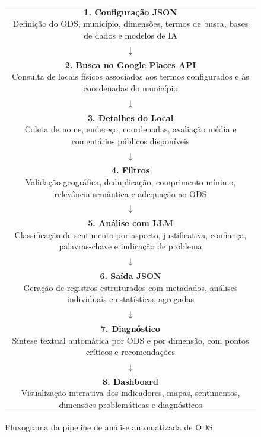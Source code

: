 \begin{figure}[!t]
    \centering
    \caption{Fluxograma da pipeline de análise automatizada de ODS}
    \label{fig:fluxo-pipeline}
    \normalsize
    \setlength{\fboxsep}{6pt}
    \renewcommand{\arraystretch}{1.0}
    \begin{tabular}{c}
        \fbox{\parbox{0.78\textwidth}{\centering \textbf{1. Configuração JSON}\\Definição do ODS, município, dimensões, termos de busca, bases de dados e modelos de IA}}\\[0.18cm]
        $\downarrow$\\[0.18cm]
        \fbox{\parbox{0.78\textwidth}{\centering \textbf{2. Busca no Google Places API}\\Consulta de locais físicos associados aos termos configurados e às coordenadas do município}}\\[0.18cm]
        $\downarrow$\\[0.18cm]
        \fbox{\parbox{0.78\textwidth}{\centering \textbf{3. Detalhes do Local}\\Coleta de nome, endereço, coordenadas, avaliação média e comentários públicos disponíveis}}\\[0.18cm]
        $\downarrow$\\[0.18cm]
        \fbox{\parbox{0.78\textwidth}{\centering \textbf{4. Filtros}\\Validação geográfica, deduplicação, comprimento mínimo, relevância semântica e adequação ao ODS}}\\[0.18cm]
        $\downarrow$\\[0.18cm]
        \fbox{\parbox{0.78\textwidth}{\centering \textbf{5. Análise com LLM}\\Classificação de sentimento por aspecto, justificativa, confiança, palavras-chave e indicação de problema}}\\[0.18cm]
        $\downarrow$\\[0.18cm]
        \fbox{\parbox{0.78\textwidth}{\centering \textbf{6. Saída JSON}\\Geração de registros estruturados com metadados, análises individuais e estatísticas agregadas}}\\[0.18cm]
        $\downarrow$\\[0.18cm]
        \fbox{\parbox{0.78\textwidth}{\centering \textbf{7. Diagnóstico}\\Síntese textual automática por ODS e por dimensão, com pontos críticos e recomendações}}\\[0.18cm]
        $\downarrow$\\[0.18cm]
        \fbox{\parbox{0.78\textwidth}{\centering \textbf{8. Dashboard}\\Visualização interativa dos indicadores, mapas, sentimentos, dimensões problemáticas e diagnósticos}}
    \end{tabular}
\end{figure}

